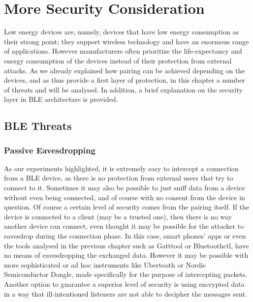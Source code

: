 \chapter{More Security Consideration}
\label{chapter4}
\thispagestyle{empty}

\noindent 

Low energy devices are, namely, devices that have low energy consumption as their strong point; they support wireless technology and have an enormous range of applications.
However manufacturers often prioritize the life-expectancy and energy consumption of the devices instead of their protection from external attacks.
As we already explained how pairing can be achieved depending on the devices, and as thus provide a first layer of protection, in this chapter a number of threats and will be analysed. In addition, a brief explanation on the security layer in BLE architecture is provided.

\section{BLE Threats}
\subsection{Passive Eavesdropping}
As our experiments highlighted, it is extremely easy to intercept a connection from a BLE device, as there is no protection from external users that try to connect to it. Sometimes it may also be possible to just sniff data from a device without even being connected, and of course with no consent from the device in question.
Of course a certain level of security comes from the pairing itself. 
If the device is connected to a client (may be a trusted one), then there is no way another device can connect, even thought it may be possible for the attacker to eavesdrop during the connection phase.
In this case, smart phones' apps or even the tools analysed in the previous chapter such as Gatttool or Bluetoothctl, have no means of eavesdropping the exchanged data.
However it may be possible with more sophisticated or ad hoc instruments like Ubertooth or Nordic Semiconductor Dongle, made specifically for the purpose of intercepting packets.
Another option to guarantee a superior level of security is using encrypted data in a way that ill-intentioned listeners are not able to decipher the messages sent.

